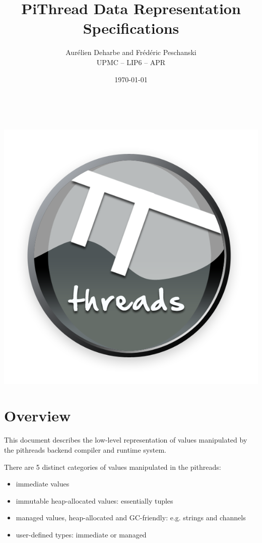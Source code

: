 \documentclass[a4paper,11pt]{article}
\title{PiThread Data Representation Specifications}
\date{\today}
\author{Aurélien Deharbe and Fr\'ed\'eric Peschanski\\ UPMC -- LIP6 -- APR}
\begin{document}
\renewcommand{\contentsname}{Table of contents}
\maketitle
$ $\newline
$ $\newline
\begin{center}
\includegraphics[scale=0.45]{pithreads.png}
\end{center}
\newpage
\tableofcontents
\newpage

\section{Overview}

This document describes the low-level representation of values manipulated
by the pithreads backend compiler and runtime system.

There are 5 distinct categories of values manipulated in the pithreads:
\begin{itemize}
\item immediate values
\item immutable heap-allocated values: essentially tuples
\item managed values, heap-allocated and GC-friendly: e.g. strings and channels 
\item user-defined types: immediate or managed
\end{itemize}
\end{document}
